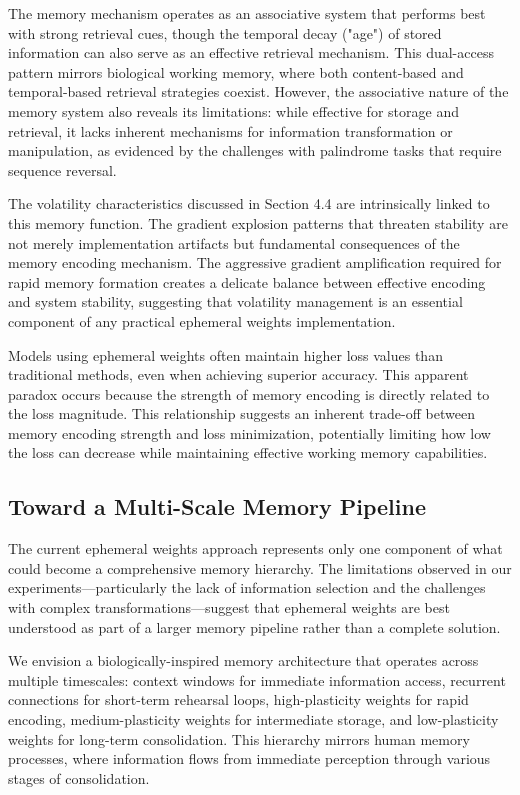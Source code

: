 \documentclass[conference]{IEEEtran}
\begin{document}
The memory mechanism operates as an associative system that performs best with strong retrieval cues, though the temporal decay ("age") of stored information can also serve as an effective retrieval mechanism. This dual-access pattern mirrors biological working memory, where both content-based and temporal-based retrieval strategies coexist. However, the associative nature of the memory system also reveals its limitations: while effective for storage and retrieval, it lacks inherent mechanisms for information transformation or manipulation, as evidenced by the challenges with palindrome tasks that require sequence reversal.

The volatility characteristics discussed in Section 4.4 are intrinsically linked to this memory function. The gradient explosion patterns that threaten stability are not merely implementation artifacts but fundamental consequences of the memory encoding mechanism. The aggressive gradient amplification required for rapid memory formation creates a delicate balance between effective encoding and system stability, suggesting that volatility management is an essential component of any practical ephemeral weights implementation.

Models using ephemeral weights often maintain higher loss values than traditional methods, even when achieving superior accuracy. This apparent paradox occurs because the strength of memory encoding is directly related to the loss magnitude. This relationship suggests an inherent trade-off between memory encoding strength and loss minimization, potentially limiting how low the loss can decrease while maintaining effective working memory capabilities.

\subsection{Toward a Multi-Scale Memory Pipeline}

The current ephemeral weights approach represents only one component of what could become a comprehensive memory hierarchy. The limitations observed in our experiments—particularly the lack of information selection and the challenges with complex transformations—suggest that ephemeral weights are best understood as part of a larger memory pipeline rather than a complete solution.

We envision a biologically-inspired memory architecture that operates across multiple timescales: context windows for immediate information access, recurrent connections for short-term rehearsal loops, high-plasticity weights for rapid encoding, medium-plasticity weights for intermediate storage, and low-plasticity weights for long-term consolidation. This hierarchy mirrors human memory processes, where information flows from immediate perception through various stages of consolidation.
\end{document}
